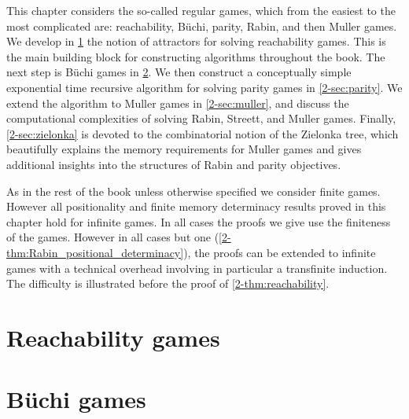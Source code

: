 

This chapter considers the so-called regular games, which from the easiest to the most complicated are: reachability, B{\"u}chi,
parity, Rabin, and then Muller games.
We develop in \cref{2-sec:attractors} the notion of attractors for solving reachability games. 
This is the main building block for constructing algorithms throughout the book.
The next step is B{\"u}chi games in \cref{2-sec:buchi}. 
We then construct a conceptually simple exponential time recursive algorithm for solving parity games in \cref{2-sec:parity}.
We extend the algorithm to Muller games in \cref{2-sec:muller}, and discuss the computational complexities of solving Rabin, Streett, and Muller games.
Finally, \cref{2-sec:zielonka} is devoted to the combinatorial notion of the Zielonka tree, 
which beautifully explains the memory requirements for Muller games and gives additional insights into the structures of Rabin and parity objectives.

\begin{remark}
As in the rest of the book unless otherwise specified we consider finite games.
However all positionality and finite memory determinacy results proved in this chapter hold for infinite games.
In all cases the proofs we give use the finiteness of the games.
However in all cases %
but one (\cref{2-thm:Rabin_positional_determinacy}),
the proofs can be extended to infinite games with a technical overhead involving in particular a transfinite induction.
The difficulty is illustrated before the proof of \cref{2-thm:reachability}.
\end{remark}


\section{Reachability games}
\label{2-sec:attractors}



\section{B{\"u}chi games}
\label{2-sec:buchi}



